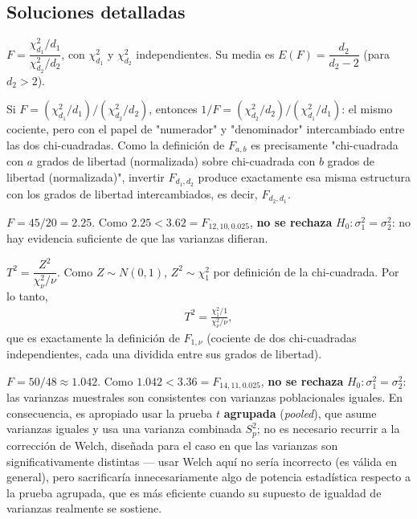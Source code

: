 \subsection*{Soluciones detalladas}

\begin{solproblema}[prob:20ee012]
	$F = \dfrac{\chi^2_{d_1}/d_1}{\chi^2_{d_2}/d_2}$, con $\chi^2_{d_1}$ y $\chi^2_{d_2}$ independientes. Su media es $E(F) = \dfrac{d_2}{d_2-2}$ (para $d_2>2$).
\end{solproblema}

\begin{solproblema}[prob:2e8078c]
	Si $F = (\chi^2_{d_1}/d_1)/(\chi^2_{d_2}/d_2)$, entonces $1/F = (\chi^2_{d_2}/d_2)/(\chi^2_{d_1}/d_1)$: el mismo cociente, pero con el papel de "numerador" y "denominador" intercambiado entre las dos chi-cuadradas. Como la definición de $F_{a,b}$ es precisamente "chi-cuadrada con $a$ grados de libertad (normalizada) sobre chi-cuadrada con $b$ grados de libertad (normalizada)", invertir $F_{d_1,d_2}$ produce exactamente esa misma estructura con los grados de libertad intercambiados, es decir, $F_{d_2,d_1}$.
\end{solproblema}

\begin{solproblema}[prob:b47df2a]
	$F = 45/20 = 2.25$. Como $2.25 < 3.62 = F_{12,10,0.025}$, \textbf{no se rechaza} $H_0:\sigma_1^2=\sigma_2^2$: no hay evidencia suficiente de que las varianzas difieran.
\end{solproblema}

\begin{solproblema}[prob:23d903e]
	$T^2 = \dfrac{Z^2}{\chi^2_\nu/\nu}$. Como $Z\sim N(0,1)$, $Z^2\sim\chi^2_1$ por definición de la chi-cuadrada. Por lo tanto,
	\begin{align*}
		T^2 = \frac{\chi^2_1/1}{\chi^2_\nu/\nu},
	\end{align*}
	que es exactamente la definición de $F_{1,\nu}$ (cociente de dos chi-cuadradas independientes, cada una dividida entre sus grados de libertad).
\end{solproblema}

\begin{solproblema}[prob:e04a795]
	$F = 50/48 \approx1.042$. Como $1.042 < 3.36 = F_{14,11,0.025}$, \textbf{no se rechaza} $H_0:\sigma_1^2=\sigma_2^2$: las varianzas muestrales son consistentes con varianzas poblacionales iguales. En consecuencia, es apropiado usar la prueba $t$ \textbf{agrupada} (\emph{pooled}), que asume varianzas iguales y usa una varianza combinada $S_p^2$; no es necesario recurrir a la corrección de Welch, diseñada para el caso en que las varianzas son significativamente distintas — usar Welch aquí no sería incorrecto (es válida en general), pero sacrificaría innecesariamente algo de potencia estadística respecto a la prueba agrupada, que es más eficiente cuando su supuesto de igualdad de varianzas realmente se sostiene.
\end{solproblema}

